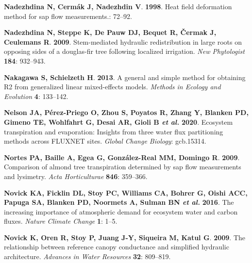\documentclass[11pt,twoside]{reedthesis}
\begin{document}
\hypertarget{ref-Nadezhdina1998}{}
\textbf{\textnormal{Nadezhdina N}, \textnormal{Cermák J},
\textnormal{Nadezhdin V}}. \textbf{1998}. Heat field deformation method
for sap flow measurements.: 72--92.

\hypertarget{ref-Nadezhdina2009}{}
\textbf{\textnormal{Nadezhdina N}, \textnormal{Steppe K}, \textnormal{De
Pauw DJ}, \textnormal{Bequet R}, \textnormal{Čermak J},
\textnormal{Ceulemans R}}. \textbf{2009}. Stem-mediated hydraulic
redistribution in large roots on opposing sides of a douglas-fir tree
following localized irrigation. \emph{New Phytologist} \textbf{184}:
932--943.

\hypertarget{ref-Nakagawa2013}{}
\textbf{\textnormal{Nakagawa S}, \textnormal{Schielzeth H}}.
\textbf{2013}. A general and simple method for obtaining R2 from
generalized linear mixed-effects models. \emph{Methods in Ecology and
Evolution} \textbf{4}: 133--142.

\hypertarget{ref-nelson_ecosystem_2020}{}
\textbf{\textnormal{Nelson JA}, \textnormal{Pérez‐Priego O},
\textnormal{Zhou S}, \textnormal{Poyatos R}, \textnormal{Zhang Y},
\textnormal{Blanken PD}, \textnormal{Gimeno TE}, \textnormal{Wohlfahrt
G}, \textnormal{Desai AR}, \textnormal{Gioli B} \emph{et al.}}
\textbf{2020}. Ecosystem transpiration and evaporation: Insights from
three water flux partitioning methods across FLUXNET sites. \emph{Global
Change Biology}: gcb.15314.

\hypertarget{ref-Nortes2009}{}
\textbf{\textnormal{Nortes PA}, \textnormal{Baille A}, \textnormal{Egea
G}, \textnormal{González-Real MM}, \textnormal{Domingo R}}.
\textbf{2009}. Comparison of almond tree transpiration determined by sap
flow measurements and lysimetry. \emph{Acta Horticulturae} \textbf{846}:
359--366.

\hypertarget{ref-Novick2016}{}
\textbf{\textnormal{Novick KA}, \textnormal{Ficklin DL},
\textnormal{Stoy PC}, \textnormal{Williams CA}, \textnormal{Bohrer G},
\textnormal{Oishi ACC}, \textnormal{Papuga SA}, \textnormal{Blanken PD},
\textnormal{Noormets A}, \textnormal{Sulman BN} \emph{et al.}}
\textbf{2016}. The increasing importance of atmospheric demand for
ecosystem water and carbon fluxes. \emph{Nature Climate Change}
\textbf{1}: 1--5.

\hypertarget{ref-Novick2009}{}
\textbf{\textnormal{Novick K}, \textnormal{Oren R}, \textnormal{Stoy P},
\textnormal{Juang J-Y}, \textnormal{Siqueira M}, \textnormal{Katul G}}.
\textbf{2009}. The relationship between reference canopy conductance and
simplified hydraulic architecture. \emph{Advances in Water Resources}
\textbf{32}: 809--819.
\end{document}
